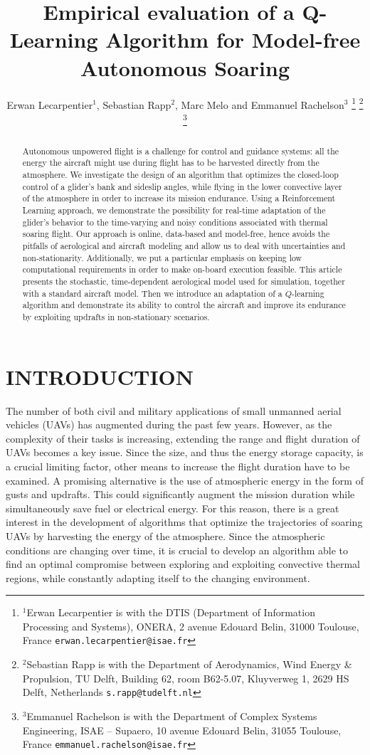 \documentclass[a4paper, 10pt, conference]{ieeeconf}
\title{\LARGE \bf
	Empirical evaluation of a Q-Learning Algorithm for Model-free Autonomous Soaring
}
\author{Erwan Lecarpentier$^{1}$, Sebastian Rapp$^{2}$, Marc Melo and Emmanuel Rachelson$^{3}$
	\thanks{$^{1}$Erwan Lecarpentier is with the DTIS (Department of Information Processing and Systems), ONERA, 2 avenue Edouard Belin, 31000 Toulouse, France
	{\tt\small erwan.lecarpentier@isae.fr}}
	\thanks{$^{2}$Sebastian  Rapp is with the Department of Aerodynamics, Wind Energy \& Propulsion, TU Delft, Building 62, room B62-5.07, Kluyverweg 1, 2629 HS Delft, Netherlands
	{\tt\small s.rapp@tudelft.nl}}
	\thanks{$^{3}$Emmanuel Rachelson is with the Department of Complex Systems Engineering, ISAE -- Supaero, 10 avenue Edouard Belin, 31055 Toulouse, France
	{\tt\small emmanuel.rachelson@isae.fr}}
}
\begin{document}
\maketitle
\thispagestyle{empty}
\pagestyle{empty}

\begin{abstract}
Autonomous unpowered flight is a challenge for control and guidance systems: all the energy the aircraft might use during flight has to be harvested directly from the atmosphere.
We investigate the design of an algorithm that optimizes the closed-loop control of a glider's bank and sideslip angles, while flying in the lower convective layer of the atmosphere in order to increase its mission endurance.
Using a Reinforcement Learning approach, we demonstrate the possibility for real-time adaptation of the glider's behavior to the time-varying and noisy conditions associated with thermal soaring flight.
Our approach is online, data-based and model-free, hence avoids the pitfalls of aerological and aircraft modeling and allow us to deal with uncertainties and non-stationarity.
Additionally, we put a particular emphasis on keeping low computational requirements in order to make on-board execution feasible.
This article presents the stochastic, time-dependent aerological model used for simulation, together with a standard aircraft model. Then we introduce an adaptation of a $Q$-learning algorithm and demonstrate its ability to control the aircraft and improve its endurance by exploiting updrafts in non-stationary scenarios.
\end{abstract}


\section{INTRODUCTION}

The number of both civil and military applications of small unmanned aerial vehicles (UAVs) has augmented during the past few years. However, as the complexity of their tasks is increasing, extending the range and flight duration of UAVs becomes a key issue. Since the size, and thus the energy storage capacity, is a crucial limiting factor, other means to increase the flight duration have to be examined. A promising alternative is the use of atmospheric energy in the form of gusts and updrafts. This could significantly augment the mission duration while simultaneously save fuel or electrical energy. For this reason, there is a great interest in the development of algorithms that optimize the trajectories of soaring UAVs by harvesting the energy of the atmosphere. Since the atmospheric conditions are changing over time, it is crucial to develop an algorithm able to find an optimal compromise between exploring and exploiting convective thermal regions, while constantly adapting itself to the changing environment.
\end{document}
